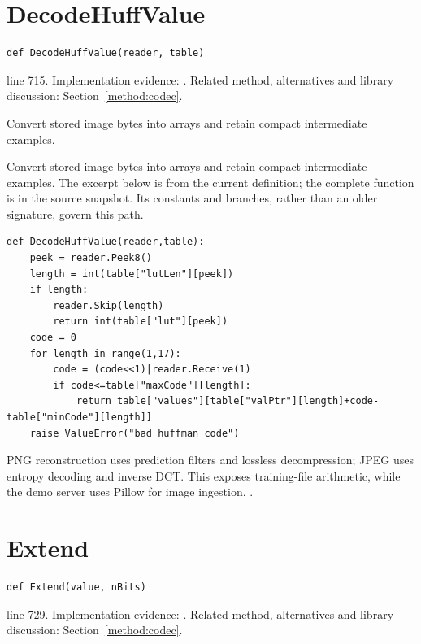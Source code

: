\section{DecodeHuffValue}\label{fn:train:DecodeHuffValue}
\begin{lstlisting}[style=sig]
def DecodeHuffValue(reader, table)
\end{lstlisting}
 line 715. Implementation evidence: \cite{code2026}. Related method, alternatives and library discussion: Section~\ref{method:codec}.


Convert stored image bytes into arrays and retain compact intermediate examples.


Convert stored image bytes into arrays and retain compact intermediate examples. The excerpt below is from the current definition; the complete function is in the source snapshot. Its constants and branches, rather than an older signature, govern this path.


\begin{lstlisting}[style=plain]
def DecodeHuffValue(reader,table):
    peek = reader.Peek8()
    length = int(table["lutLen"][peek])
    if length:
        reader.Skip(length)
        return int(table["lut"][peek])
    code = 0
    for length in range(1,17):
        code = (code<<1)|reader.Receive(1)
        if code<=table["maxCode"][length]:
            return table["values"][table["valPtr"][length]+code-table["minCode"][length]]
    raise ValueError("bad huffman code")
\end{lstlisting}
PNG reconstruction uses prediction filters and lossless decompression; JPEG uses entropy decoding and inverse DCT. This exposes training-file arithmetic, while the demo server uses Pillow for image ingestion. \cite{pngspec,jpegspec,pillowimage}.


\section{Extend}\label{fn:train:Extend}
\begin{lstlisting}[style=sig]
def Extend(value, nBits)
\end{lstlisting}
 line 729. Implementation evidence: \cite{code2026}. Related method, alternatives and library discussion: Section~\ref{method:codec}.


